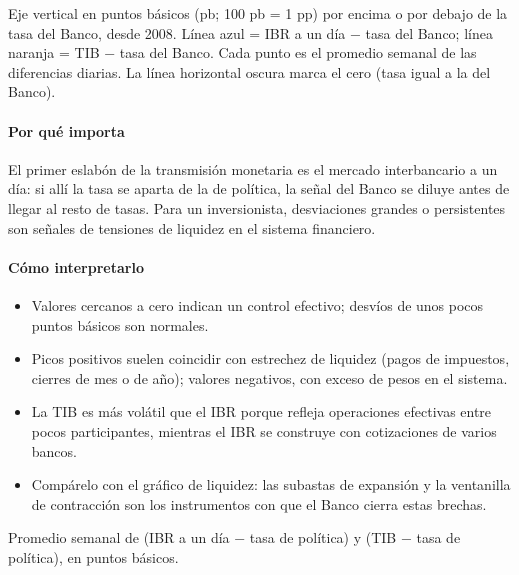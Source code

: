 \begin{leer}
Eje vertical en puntos básicos (pb; 100 pb = 1 pp) por encima o por debajo de la tasa del Banco, desde 2008. Línea azul = IBR a un día − tasa del Banco; línea naranja = TIB − tasa del Banco. Cada punto es el promedio semanal de las diferencias diarias. La línea horizontal oscura marca el cero (tasa igual a la del Banco).
\end{leer}

\paragraph{Por qué importa}
El primer eslabón de la transmisión monetaria es el mercado interbancario a un día: si allí la tasa se aparta de la de política, la señal del Banco se diluye antes de llegar al resto de tasas. Para un inversionista, desviaciones grandes o persistentes son señales de tensiones de liquidez en el sistema financiero.

\paragraph{Cómo interpretarlo}
\begin{itemize}
\item Valores cercanos a cero indican un control efectivo; desvíos de unos pocos puntos básicos son normales.
\item Picos positivos suelen coincidir con estrechez de liquidez (pagos de impuestos, cierres de mes o de año); valores negativos, con exceso de pesos en el sistema.
\item La TIB es más volátil que el IBR porque refleja operaciones efectivas entre pocos participantes, mientras el IBR se construye con cotizaciones de varios bancos.
\item Compárelo con el gráfico de liquidez: las subastas de expansión y la ventanilla de contracción son los instrumentos con que el Banco cierra estas brechas.
\end{itemize}
\begin{formulas}[Fórmulas]
\end{formulas}
\begin{metodo}[Metodología]
Promedio semanal de (IBR a un día − tasa de política) y (TIB − tasa de política), en puntos básicos.
\par{}
\end{metodo}

